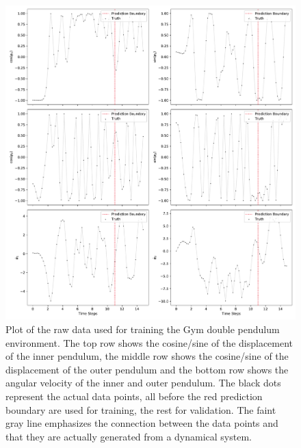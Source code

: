 			\begin{figure}
				\centering
				\includegraphics[width=\linewidth]{figures/experiments/environments/observations-acrobot-gym-N0.pdf}
				\caption[Raw data of the double pendulum environment]{Plot of the raw data used for training the Gym double pendulum environment. The top row shows the cosine/sine of the displacement of the inner pendulum, the middle row shows the cosine/sine of the displacement of the outer pendulum and the bottom row shows the angular velocity of the inner and outer pendulum. The black dots represent the actual data points, all before the red prediction boundary are used for training, the rest for validation. The faint gray line emphasizes the connection between the data points and that they are actually generated from a dynamical system.}
				\label{fig:envDoublePendulumGym}
			\end{figure}

